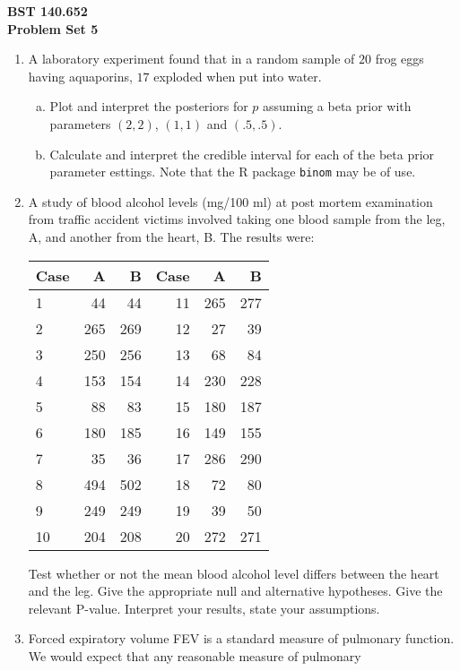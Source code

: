 \documentclass[12pt]{article}
\begin{document}
\noindent
{\bf BST 140.652 \\ Problem Set 5} \\

\begin{enumerate}[Problem 1.]
\item A laboratory experiment found that in a random sample of $20$
  frog eggs having aquaporins, $17$ exploded when put into water.
  \begin{enumerate}[a.]
  \item Plot and interpret the posteriors for $p$ assuming a beta prior with
    parameters $(2,2)$, $(1, 1)$ and $(.5, .5)$.
  \item Calculate and interpret the credible interval for each of the
    beta prior parameter esttings. Note that the R package
    \texttt{binom} may be of use.
  \end{enumerate}
\item A study of blood alcohol levels (mg/100 ml) at post mortem
  examination from traffic accident victims involved taking one blood
  sample from the leg, A, and another from the heart, B.  The results
  were:
\begin{center}
\ttfamily
\begin{tabular}{lrrrrr}
\hline
Case & A & B & Case & A & B   \\ \hline
1 &  44 &   44 &  11 & 265 &  277 \\
2 & 265 &  269 &  12 &  27 &   39 \\
3 & 250 &  256 &  13 &  68 &   84 \\
4 & 153 &  154 &  14 & 230 &  228 \\
5 &  88 &  83  &  15 & 180 &  187 \\
6 & 180 &  185 &  16 & 149 &  155 \\
7 &  35 &   36 &  17 & 286 &  290 \\
8 & 494 &  502 &  18 &  72 &  80  \\
9 & 249 &  249 &  19 &  39 &  50  \\
10& 204 &  208 &  20 & 272 &  271 \\ \hline
\end{tabular}
\end{center}
\normalfont Test whether or not the mean blood alcohol level differs
between the heart and the leg.  Give the appropriate null and
alternative hypotheses. Give the relevant P-value. Interpret your
results, state your assumptions.
\item Forced expiratory volume FEV is a standard measure of pulmonary
  function.  We would expect that any reasonable measure of pulmonary

\end{enumerate}
\end{document}
